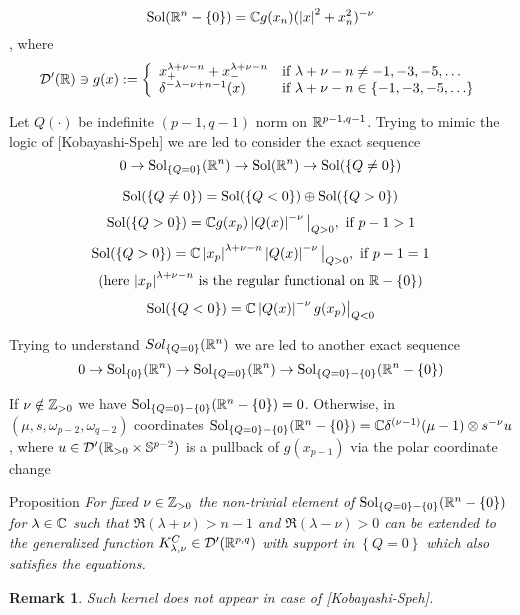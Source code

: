 \documentclass[8pt,pdf,notes]{beamer}
\newcommand{\Sol}{\mbox{Sol}}
\newcommand{\D}{\mathcal{D}}
\renewcommand{\setminus}{-}
\newenvironment{prop}{\begin{exampleblock}{Proposition}\it}{\end{exampleblock}}
\theoremstyle{mystyle}
\newtheorem*{remark}{Remark}
\begin{document}
\begin{frame}
\begin{theorem}
	\[\Sol(\R^n-\mycbra{0})=\C g(x_n)(\myabs{x}^2+x_n^2)^{-\nu}\], where
	\[\mathcal{D}'(\mathbb{R})\ni g(x):=\left\{\begin{array}{ll}
				x_+^{\lambda+\nu-n}+x_-^{\lambda+\nu-n}&\mbox{if }\lambda+\nu-n\neq-1,-3,-5,\hdots\\
				\delta^{-\lambda-\nu+n-1}(x)&\mbox{if }\lambda+\nu-n\in\left\{-1,-3,-5,\hdots\right\}\\
		\end{array}\right.\]
\end{theorem}
Let $Q(\cdot)$ be indefinite $(p-1,q-1)$ norm on $\mathbb{R}^{p-1,q-1}$.  
Trying to mimic the logic of [Kobayashi-Speh] we are led to consider the exact sequence
\[0\rightarrow \Sol_{\mycbra{Q=0}}(\R^n)\rightarrow \Sol(\R^n)\rightarrow\Sol(
	\mycbra{Q\neq0})\]
\begin{theorem}[$O(p,q),\;n:=(p-1)+(q-1)$]
	\[\Sol(\mycbra{Q\neq0})=\Sol(\mycbra{Q<0})\oplus \Sol(\mycbra{Q>0})\]
	\[\Sol(\mycbra{Q>0})=\C g(x_p)\myabs{Q(x)}^{-\nu}\big|_{Q>0},\mbox{ if }p-1>1\]
	\begin{multline*}\Sol(\mycbra{Q>0})=\C \myabs{x_p}^{\lambda+\nu-n}\myabs{Q(x)}^{-\nu}\big|_{Q>0},\mbox{ if }p-1=1\\
	\mbox{(here $\myabs{x_p}^{\lambda+\nu-n}$ is the regular functional on $\R-\mycbra{0}$)}\end{multline*}
	\[\Sol(\mycbra{Q<0})=\C\myabs{Q(x)}^{-\nu}g(x_p)\big|_{Q<0}\]
\end{theorem}
\end{frame}
\begin{frame}
	Trying to understand $Sol_{\left\{Q=0\right\}}(\mathbb{R}^n)$ we are led to another exact sequence
	\[0\rightarrow\Sol_{\mycbra{0}}(\R^n)\rightarrow\Sol_{\mycbra{Q=0}}(\R^n)\rightarrow
	\Sol_{\mycbra{Q=0}-\mycbra{0}}(\R^n-\mycbra{0})\]

\begin{theorem}
	If $\nu\notin\mathbb{Z}_{ >0 }$ we have $\Sol_{\mycbra{Q=0}-\mycbra{0}}(\R^n-\mycbra{0})=0$. Otherwise,
	in $(\mu,s,\omega_{ p-2 },\omega_{ q-2 })$ coordinates\footnotemark
	$\Sol_{\mycbra{Q=0}-\mycbra{0}}(\R^n-\mycbra{0})=\C\delta^{ (\nu-1) }(\mu-1)
	\otimes s^{-\nu }u$, where $u\in\mathcal{ D }'(\mathbb{R}_{ >0 }\times\mathbb{ S }^{ p-2 })$
	is a pullback of $g(x_{ p-1 })$ via the polar coordinate change\footnotemark
\end{theorem}
\begin{prop}
	For fixed $\nu\in\mathbb{Z}_{ >0 }$
	the non-trivial element of $\Sol_{\mycbra{Q=0}-\mycbra{0}}(\R^n-\mycbra{0})$ for $\lambda\in\mathbb{C}$ such that 
	$\Re(\lambda+\nu)>n-1$ and $\Re(\lambda-\nu)>0$ can be extended to the generalized function 
	$K_{\lambda,\nu}^C\in\D'(\R^{p,q})$ with support in $\left\{ Q=0 \right\}$ which also satisfies the equations.
\end{prop}
\begin{remark}
	Such kernel does not appear in case of [Kobayashi-Speh].
\end{remark}
\footnotetext{ $\R^{ p-1}\setminus\mycbra{ 0 }\ni x=\sqrt{ s }\omega_{ p-1 }$}
\end{frame}
\end{document}
